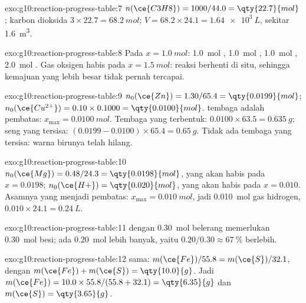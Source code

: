 \begin{solution}{exo:g10:reaction-progress-table:7}
$n(\ce{C3H8}) = 1000 / 44.0 = \qty{22.7}{mol}$; karbon dioksida
$3 \times 22.7 = \qty{68.2}{mol}$; $V = 68.2 \times 24.1 =
\qty{1.64e3}{L}$, sekitar \qty{1.6}{m^3}.
\end{solution}

\begin{solution}{exo:g10:reaction-progress-table:8}
Pada $x = \qty{1.0}{mol}$: \qty{1.0}{mol} , \qty{1.0}{mol}
, \qty{1.0}{mol} , \qty{2.0}{mol} . Gas oksigen
habis pada $x = \qty{1.5}{mol}$: reaksi berhenti di situ, sehingga
kemajuan yang lebih besar tidak pernah tercapai.
\end{solution}

\begin{solution}{exo:g10:reaction-progress-table:9}
$n_0(\ce{Zn}) = 1.30 / 65.4 = \qty{0.0199}{mol}$;
$n_0(\ce{Cu^{2+}}) = 0.10 \times 0.1000 = \qty{0.0100}{mol}$. 
tembaga adalah pembatas: $x_{\max} = \qty{0.0100}{mol}$. Tembaga yang
terbentuk: $0.0100 \times 63.5 = \qty{0.635}{g}$; seng yang tersisa:
$(0.0199 - 0.0100) \times 65.4 = \qty{0.65}{g}$. Tidak ada  tembaga
yang tersisa: warna birunya telah hilang.
\end{solution}

\begin{solution}{exo:g10:reaction-progress-table:10}
$n_0(\ce{Mg}) = 0.48 / 24.3 = \qty{0.0198}{mol}$, yang akan habis pada
$x = 0.0198$; $n_0(\ce{H+}) = \qty{0.020}{mol}$, yang akan habis pada
$x = 0.010$. Asamnya yang menjadi pembatas: $x_{\max} = \qty{0.010}{mol}$,
jadi \qty{0.010}{mol} gas hidrogen, $0.010 \times 24.1 = \qty{0.24}{L}$.
\end{solution}

\begin{solution}{exo:g10:reaction-progress-table:11}
 dengan \qty{0.30}{mol} belerang memerlukan
\qty{0.30}{mol} besi; ada \qty{0.20}{mol} lebih banyak, yaitu
$0.20 / 0.30 \approx \qty{67}{\percent}$ berlebih.
\end{solution}

\begin{solution}{exo:g10:reaction-progress-table:12}
 sama: $m(\ce{Fe})/55.8 = m(\ce{S})/32.1$, dengan
$m(\ce{Fe}) + m(\ce{S}) = \qty{10.0}{g}$. Jadi
$m(\ce{Fe}) = 10.0 \times 55.8 / (55.8 + 32.1) = \qty{6.35}{g}$ dan
$m(\ce{S}) = \qty{3.65}{g}$.
\end{solution}

